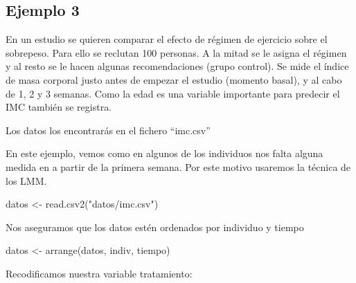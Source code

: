 \documentclass[
]{book}
\newenvironment{Shaded}{\begin{snugshade}}{\end{snugshade}}
\newcommand{\DecValTok}[1]{\textcolor[rgb]{0.00,0.00,0.81}{#1}}
\newcommand{\FunctionTok}[1]{\textcolor[rgb]{0.00,0.00,0.00}{#1}}
\newcommand{\NormalTok}[1]{#1}
\newcommand{\OtherTok}[1]{\textcolor[rgb]{0.56,0.35,0.01}{#1}}
\newcommand{\SpecialCharTok}[1]{\textcolor[rgb]{0.00,0.00,0.00}{#1}}
\newcommand{\StringTok}[1]{\textcolor[rgb]{0.31,0.60,0.02}{#1}}
\begin{document}
\hypertarget{Ejemplo3}{%
\subsection{Ejemplo 3}\label{Ejemplo3}}

En un estudio se quieren comparar el efecto de régimen de ejercicio sobre el sobrepeso. Para ello se reclutan 100 personas. A la mitad se le asigna el régimen y al resto se le hacen algunas recomendaciones (grupo control). Se mide el índice de masa corporal justo antes de empezar el estudio (momento basal), y al cabo de 1, 2 y 3 semanas. Como la edad es una variable importante para predecir el IMC también se registra.

Los datos los encontrarás en el fichero ``imc.csv''

En este ejemplo, vemos como en algunos de los individuos nos falta alguna medida en a partir de la primera semana. Por este motivo usaremos la técnica de los LMM.

\begin{Shaded}
\begin{Highlighting}[]
\NormalTok{datos }\OtherTok{\textless{}{-}} \FunctionTok{read.csv2}\NormalTok{(}\StringTok{"datos/imc.csv"}\NormalTok{)}
\end{Highlighting}
\end{Shaded}

Nos aseguramos que los datos estén ordenados por individuo y tiempo

\begin{Shaded}
\begin{Highlighting}[]
\NormalTok{datos }\OtherTok{\textless{}{-}} \FunctionTok{arrange}\NormalTok{(datos, indiv, tiempo)}
\end{Highlighting}
\end{Shaded}

Recodificamos nuestra variable tratamiento:

\begin{Shaded}
\end{Shaded}
\end{document}
